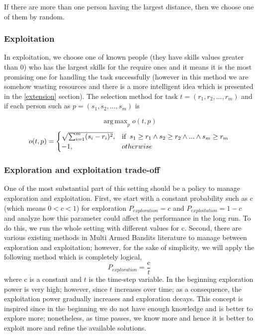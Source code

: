 \documentclass[]{article}
\begin{document}
If there are more than one person having the largest distance, then we choose one of them by random.

\subsubsection{Exploitation}
In exploitation, we choose one of known people (they have skills values greater than 0) who has the largest skills for the require ones and it means it is the most promising one for handling the task successfully (however in this method we are somehow wasting resources and there is a more intelligent idea which is presented in the \ref{extension} section). The selection method for task $t=(r_1, r_2, ..., r_m)$ and if each person such as $p=(s_1, s_2, ..., s_m) $ is

\begin{equation}
	\operatorname{arg\,max}_p o(t,p)
\end{equation}
\begin{equation*}
	o(t,p) = 
	\begin{cases}
		\sqrt{\sum_{i=1}^{m}(s_i-r_i)^2},	& \text{if\;\;} s_1 \geq r_1 \wedge s_2 \geq r_2 \wedge ... \wedge s_m \geq r_m\\
		-1,	& otherwise
	\end{cases}
\end{equation*}

\subsubsection{Exploration and exploitation trade-off}
One of the most substantial part of this setting should be a policy to manage exploration and exploitation. First, we start with a constant probability such as c (which means $0<c<1$) for exploration $P_{exploration}=c$ and $P_{exploitation}=1-c$ and analyze how this parameter could affect the performance in the long run. To do this, we run the whole setting with different values for c.
Second, there are various existing methods in Multi Armed Bandits literature \cite{auer2002finite, li2010contextual, kuleshov2014algorithms} to manage between exploration and exploitation; however, for the sake of simplicity, we will apply the following method which is completely logical,
\begin{equation}
	P_{exploration} = \frac{\text{c}}{t}
\end{equation}
where c is a constant and $t$ is the time-step variable. In the beginning exploration power is very high; however, since $t$ increases over time; as a consequence, the exploitation power gradually increases and exploration decays. This concept is inspired since in the beginning we do not have enough knowledge and is better to explore more; nonetheless, as time passes, we know more and hence it is better to exploit more and refine the available solutions.
\end{document}
